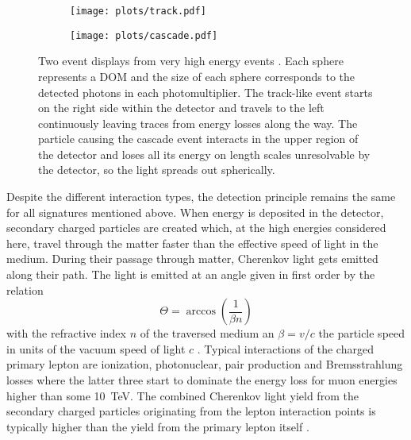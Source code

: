 \begin{figure}[htbp]
  \centering
  \begin{subfigure}[c]{0.49\textwidth}
    \centering
    \texttt{[image: plots/track.pdf]}
  \end{subfigure}
  \hfill
  \begin{subfigure}[c]{0.49\textwidth}
    \centering
    \texttt{[image: plots/cascade.pdf]}
  \end{subfigure}
  \caption[Two event displays from very high energy events]{
    Two event displays from very high energy events \cite{Aartsen:2013jdh}.
    Each sphere represents a DOM and the size of each sphere corresponds to the detected photons in each photomultiplier.
    The track-like event starts on the right side within the detector and travels to the left continuously leaving traces from energy losses along the way.
    The particle causing the cascade event interacts in the upper region of the detector and loses all its energy on length scales unresolvable by the detector, so the light spreads out spherically.
  }
  \label{fig:icecube_events_topologies}
\end{figure}

Despite the different interaction types, the detection principle remains the same for all signatures mentioned above.
When energy is deposited in the detector, secondary charged particles are created which, at the high energies considered here, travel through the matter faster than the effective speed of light in the medium.
During their passage through matter, Cherenkov light gets emitted along their path.
The light is emitted at an angle given in first order by the relation
\begin{equation}
  \Theta = \arccos\left(\frac{1}{\beta n}\right)
\end{equation}
with the refractive index $n$ of the traversed medium an $\beta = v/c$ the particle speed in units of the vacuum speed of light $c$ \cite{Cherenkov:1938origins,Mead:1958QuantRefIdx}.
Typical interactions of the charged primary lepton are ionization, photonuclear, pair production and Bremsstrahlung losses where the latter three start to dominate the energy loss for muon energies higher than some \SI{10}{\tera\eV}.
The combined Cherenkov light yield from the secondary charged particles originating from the lepton interaction points is typically higher than the yield from the primary lepton itself \cite{KOEHNE20132070,RADEL2013102}.

